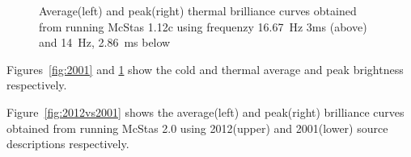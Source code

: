 \documentclass{elsarticle}
\begin{document}
\begin{figure}[h!]
\begin{minipage}{\linewidth}
\centering
{}
\caption{Average(left) and peak(right) thermal brilliance curves obtained from running McStas 1.12c using frequenzy 16.67~Hz 3ms (above) and 14~Hz, 2.86~ms below}
\label{fig:2001_t}
\end{minipage}\hfill
\end{figure}


Figures~\ref{fig:2001} and \ref{fig:2001_t} show the cold and thermal average and peak brightness respectively.

Figure~\ref{fig:2012vs2001} shows the average(left) and peak(right) brilliance curves obtained from running McStas 2.0 using 2012(upper) and 2001(lower) source descriptions respectively.
















\end{document}
